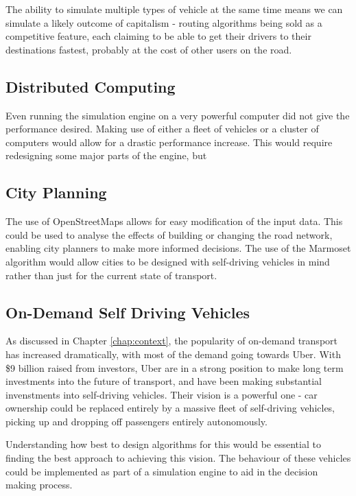\documentclass[ %
                    author={Alexander Hill},
                supervisor={Dr. Benjamin Sach},
                    degree={MEng},
                     title={MARMOSET},
                  subtitle={Multi-Agent Route Management using Online Simulation for Efficient Transportation},
                      type={research},
                      year={2016} ]{dissertation}
\begin{document}
The ability to simulate multiple types of vehicle at the same time means we can
simulate a likely outcome of capitalism - routing algorithms being sold as a
competitive feature, each claiming to be able to get their drivers to their
destinations fastest, probably at the cost of other users on the road.

\subsection*{Distributed Computing}

Even running the simulation engine on a very powerful computer did not give the
performance desired. Making use of either a fleet of vehicles or a cluster of
computers would allow for a drastic performance increase. This would require
redesigning some major parts of the engine, but

\subsection*{City Planning}

The use of OpenStreetMaps allows for easy modification of the input data.
This could be used to analyse the effects of building or changing the road
network, enabling city planners to make more informed decisions. The use of the
Marmoset algorithm would allow cities to be designed with self-driving vehicles
in mind rather than just for the current state of transport.

\subsection*{On-Demand Self Driving Vehicles}

As discussed in Chapter \ref{chap:context}, the popularity of on-demand
transport has increased dramatically, with most of the demand going towards
Uber. With \$9 billion raised from investors, Uber are in a strong position to
make long term investments into the future of transport, and have been making
substantial invenstments into self-driving vehicles. Their vision is a powerful
one - car ownership could be replaced entirely by a massive fleet of
self-driving vehicles, picking up and dropping off passengers entirely
autonomously.

Understanding how best to design algorithms for this would be essential to
finding the best approach to achieving this vision. The behaviour of these
vehicles could be implemented as part of a simulation engine to aid in the
decision making process.
\end{document}
